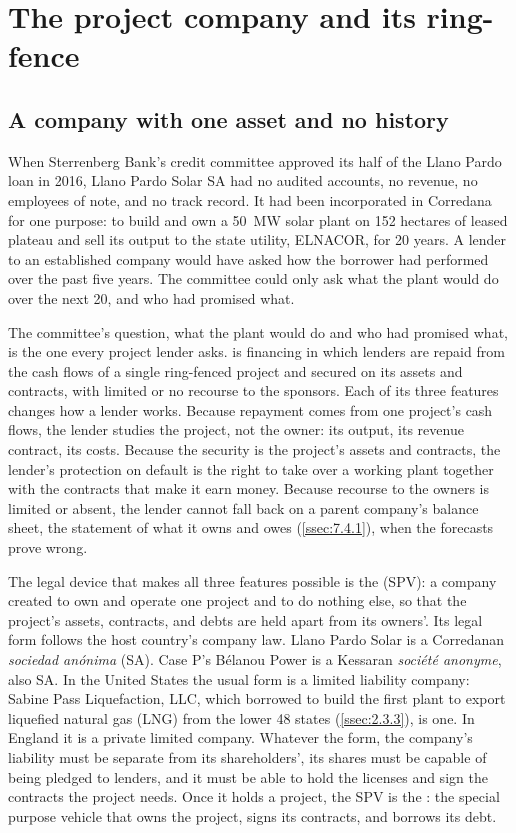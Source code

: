 \section{The project company and its ring-fence}\label{sec:2.1}

\subsection{A company with one asset and no history}\label{ssec:2.1.1}

When Sterrenberg Bank's credit committee approved its half of the Llano Pardo loan in 2016, Llano Pardo Solar SA had no audited accounts, no revenue, no employees of note, and no track record. It had been incorporated in Corredana for one purpose: to build and own a 50~MW solar plant on 152 hectares of leased plateau and sell its output to the state utility, ELNACOR, for 20 years. A lender to an established company would have asked how the borrower had performed over the past five years. The committee could only ask what the plant would do over the next 20, and who had promised what.

The committee's question, what the plant would do and who had promised what, is the one every project lender asks.  is financing in which lenders are repaid from the cash flows of a single ring-fenced project and secured on its assets and contracts, with limited or no recourse to the sponsors. Each of its three features changes how a lender works. Because repayment comes from one project's cash flows, the lender studies the project, not the owner: its output, its revenue contract, its costs. Because the security is the project's assets and contracts, the lender's protection on default is the right to take over a working plant together with the contracts that make it earn money. Because recourse to the owners is limited or absent, the lender cannot fall back on a parent company's balance sheet, the statement of what it owns and owes (\cref{ssec:7.4.1}), when the forecasts prove wrong.

The legal device that makes all three features possible is the  (SPV): a company created to own and operate one project and to do nothing else, so that the project's assets, contracts, and debts are held apart from its owners'. Its legal form follows the host country's company law. Llano Pardo Solar is a Corredanan \emph{sociedad anónima} (SA). Case P's Bélanou Power is a Kessaran \emph{société anonyme}, also SA. In the United States the usual form is a limited liability company: Sabine Pass Liquefaction, LLC, which borrowed to build the first plant to export liquefied natural gas (LNG) from the lower 48 states (\cref{ssec:2.3.3}), is one. In England it is a private limited company. Whatever the form, the company's liability must be separate from its shareholders', its shares must be capable of being pledged to lenders, and it must be able to hold the licenses and sign the contracts the project needs. Once it holds a project, the SPV is the : the special purpose vehicle that owns the project, signs its contracts, and borrows its debt.

